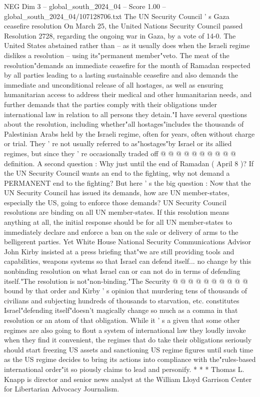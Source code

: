 \begin{textsample}{NEG Dim 3 – global\_south\_2024\_04 – Score 1.00 – global\_south\_2024\_04/107128706.txt}  \label{ex:f3_neg_264}
The UN Security Council ' s Gaza ceasefire resolution On March 25, the United Nations Security Council passed Resolution 2728, regarding the ongoing war in Gaza, by a vote of 14-0.
The United States abstained rather than -- as it usually does when the Israeli regime dislikes a resolution -- using its"permanent member"veto.
The meat of the resolution"demands an immediate ceasefire for the month of Ramadan respected by all parties leading to a lasting sustainable ceasefire and also demands the immediate and unconditional release of all hostages, as well as ensuring humanitarian access to address their medical and other humanitarian needs, and further demands that the parties comply with their obligations under international law in relation to all persons they detain."I have several questions about the resolution, including whether"all hostages"includes the thousands of Palestinian Arabs held by the Israeli regime, often for years, often without charge or trial.
They ' re not usually referred to as"hostages"by Israel or its allied regimes, but since they ' re occasionally traded off @ @ @ @ @ @ @ @ @ @ definition.
A second question : Why just until the end of Ramadan ( April 8 )?
If the UN Security Council wants an end to the fighting, why not demand a PERMANENT end to the fighting?
But here ' s the big question : Now that the UN Security Council has issued its demands, how are UN member-states, especially the US, going to enforce those demands?
UN Security Council resolutions are binding on all UN member-states.
If this resolution means anything at all, the initial response should be for all UN member-states to immediately declare and enforce a ban on the sale or delivery of arms to the belligerent parties.
Yet White House National Security Communications Advisor John Kirby insisted at a press briefing that"we are still providing tools and capabilities, weapons systems so that Israel can defend itself... no change by this nonbinding resolution on what Israel can or can not do in terms of defending itself."The resolution is not"non-binding."The Security @ @ @ @ @ @ @ @ @ @ bound by that order and Kirby ' s opinion that murdering tens of thousands of civilians and subjecting hundreds of thousands to starvation, etc. constitutes Israel"defending itself"doesn't magically change so much as a comma in that resolution or an atom of that obligation.
While it ' s a given that some other regimes are also going to flout a system of international law they loudly invoke when they find it convenient, the regimes that do take their obligations seriously should start freezing US assets and sanctioning US regime figures until such time as the US regime decides to bring its actions into compliance with the"rules-based international order"it so piously claims to lead and personify. * * * Thomas L.
Knapp is director and senior news analyst at the William Lloyd Garrison Center for Libertarian Advocacy Journalism.

\end{textsample}

